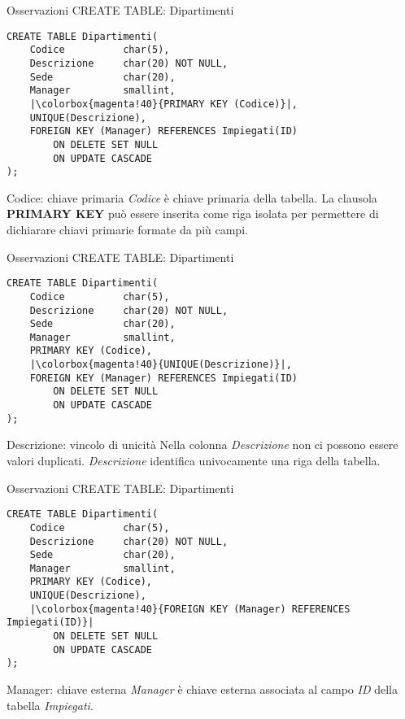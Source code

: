 %
\begin{frame}[fragile]{Osservazioni CREATE TABLE: Dipartimenti}
\vspace{-.6cm}
\begin{lstlisting}
CREATE TABLE Dipartimenti(
    Codice          char(5),
    Descrizione     char(20) NOT NULL,
    Sede            char(20),
    Manager         smallint,
    |\colorbox{magenta!40}{PRIMARY KEY (Codice)}|,
    UNIQUE(Descrizione),
    FOREIGN KEY (Manager) REFERENCES Impiegati(ID)
        ON DELETE SET NULL
        ON UPDATE CASCADE
);    
\end{lstlisting}
\begin{block}{Codice: chiave primaria}
    \textit{Codice} \`e chiave primaria della tabella. La clausola \textbf{PRIMARY KEY} pu\`o essere inserita come riga isolata per permettere di dichiarare chiavi primarie formate da pi\`u campi.
\end{block}
\end{frame}
%
\begin{frame}[fragile]{Osservazioni CREATE TABLE: Dipartimenti}
\vspace{-.6cm}
\begin{lstlisting}
CREATE TABLE Dipartimenti(
    Codice          char(5),
    Descrizione     char(20) NOT NULL,
    Sede            char(20),
    Manager         smallint,
    PRIMARY KEY (Codice),
    |\colorbox{magenta!40}{UNIQUE(Descrizione)}|,
    FOREIGN KEY (Manager) REFERENCES Impiegati(ID)
        ON DELETE SET NULL
        ON UPDATE CASCADE
);    
\end{lstlisting}
\begin{block}{Descrizione: vincolo di unicit\`a}
    Nella colonna \textit{Descrizione} non ci possono essere valori duplicati. \textit{Descrizione} identifica univocamente una riga della tabella.
\end{block}
\end{frame}
%
\begin{frame}[fragile]{Osservazioni CREATE TABLE: Dipartimenti}
\vspace{-.6cm}
\begin{lstlisting}
CREATE TABLE Dipartimenti(
    Codice          char(5),
    Descrizione     char(20) NOT NULL,
    Sede            char(20),
    Manager         smallint,
    PRIMARY KEY (Codice),
    UNIQUE(Descrizione),
    |\colorbox{magenta!40}{FOREIGN KEY (Manager) REFERENCES Impiegati(ID)}|
        ON DELETE SET NULL
        ON UPDATE CASCADE
);    
\end{lstlisting}
\begin{block}{Manager: chiave esterna}
    \textit{Manager} \`e chiave esterna associata al campo \textit{ID} della tabella \textit{Impiegati}.
\end{block}
\end{frame}
